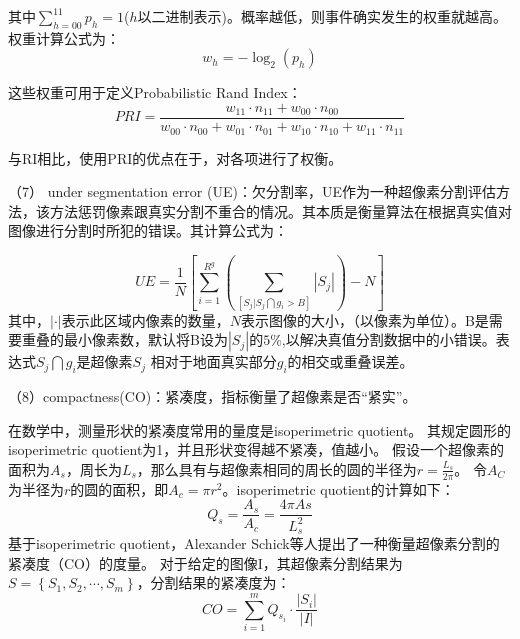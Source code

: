 其中$\sum_{h=00}^{11}p_{h}=1$($h$以二进制表示)。概率越低，则事件确实发生的权重就越高。权重计算公式为：
\begin{equation}
w_{h} = -\log_2\left ( p_{h}\right )
\end{equation}

这些权重可用于定义Probabilistic Rand Index：
\begin{equation}
PRI = \frac{w_{11}\cdot n_{11}+w_{00}\cdot n_{00}}
{w_{00}\cdot n_{00}+w_{01}\cdot n_{01}+w_{10}\cdot n_{10}+w_{11}\cdot n_{11}}
\end{equation}

与RI相比，使用PRI的优点在于，对各项进行了权衡。

（7） under segmentation error (UE)：欠分割率，UE作为一种超像素分割评估方法，该方法惩罚像素跟真实分割不重合的情况。其本质是衡量算法在根据真实值对图像进行分割时所犯的错误。其计算公式为：

\begin{equation}
UE = \frac{1}{N}\left [ \sum_{i=1}^{R^{g}}(\sum_{\left [ S_{j}|S_{j} \bigcap g_{i}> B \right ]}
\left | S_{j} \right |   )-N   \right ]
\end{equation}
其中，$\left | \cdot \right |$表示此区域内像素的数量，$N$表示图像的大小，（以像素为单位）。B是需要重叠的最小像素数，默认将B设为$\left | S_{j} \right |$的$5\%$,以解决真值分割数据中的小错误。表达式$S_{j} \bigcap g_{i}$是超像素$S_{j}$ 相对于地面真实部分$g_{i}$的相交或重叠误差。

（8）compactness(CO)：紧凑度，指标衡量了超像素是否“紧实”。

在数学中，测量形状的紧凑度常用的量度是isoperimetric quotient。
其规定圆形的isoperimetric quotient为1，并且形状变得越不紧凑，值越小。
假设一个超像素的面积为$A_{s}$，周长为$L_{s}$，那么具有与超像素相同的周长的圆的半径为$r = \frac{L_{s}}{2\pi}$。
令$A_C$为半径为$r$的圆的面积，即$A_{c}=\pi r^{2}$。isoperimetric quotient的计算如下：
\begin{equation}
Q_{s} = \frac{A_{s}}{A_{c}} = \frac{4\pi A{s}}{L_{s}^{2}}
\end{equation}
基于isoperimetric quotient，Alexander Schick等人提出了一种衡量超像素分割的紧凑度（CO）的度量。 对于给定的图像I，其超像素分割结果为$S = \left \{ S_{1},S_{2},\cdots ,S_{m} \right \}$，分割结果的紧凑度为：
\begin{equation}
CO=\sum_{i=1}^{m}Q_{s_{i}}\cdot \frac{\left | S_{i}\right |}{\left | I\right |}
\end{equation}


